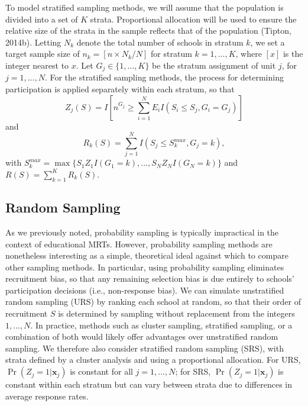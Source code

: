 \documentclass[
  english,
  man,floatsintext]{apa6}
\begin{document}
To model stratified sampling methods, we will assume that the population is divided into a set of \(K\) strata. Proportional allocation will be used to ensure the relative size of the strata in the sample reflects that of the population (Tipton, 2014b).
Letting \(N_k\) denote the total number of schools in stratum \(k\), we set a target sample size of \(n_k = [n \times N_k / N]\) for stratum \(k = 1,...,K\), where \([x]\) is the integer nearest to \(x\).
Let \(G_j \in \{1,...,K\}\) be the stratum assignment of unit \(j\), for \(j = 1,...,N\).
For the stratified sampling methods, the process for determining participation is applied separately within each stratum, so that
\begin{equation}
\label{eq:Zj-strat}
Z_j(S) = I\left[n^{G_j} \geq \sum_{i=1}^N E_i I\left(S_i \leq S_j, G_i = G_j\right)\right]
\end{equation}
and
\begin{equation}
\label{eq:R-strat}
R_k(S) = \sum_{j=1}^N I\left(S_j \leq S^{max}_k, G_j = k\right),
\end{equation}
with \(S^{max}_k = \max \{S_1 Z_1 I(G_1 = k), ..., S_N Z_N I(G_N = k)\}\) and \(R(S) = \sum_{k=1}^K R_k(S)\).

\hypertarget{random-sampling}{%
\subsection{Random Sampling}\label{random-sampling}}

As we previously noted, probability sampling is typically impractical in the context of educational MRTs. However, probability sampling methods are nonetheless interesting as a simple, theoretical ideal against which to compare other sampling methods.
In particular, using probability sampling eliminates recruitment bias, so that any remaining selection bias is due entirely to schools' participation decisions (i.e., non-response bias).
We can simulate unstratified random sampling (URS) by ranking each school at random, so that their order of recruitment \(S\) is determined by sampling without replacement from the integers \(1,...,N\). In practice, methods such as cluster sampling, stratified sampling, or a combination of both would likely offer advantages over unstratified random sampling. We therefore also consider stratified random sampling (SRS), with strata defined by a cluster analysis and using a proportional allocation. For URS, \(\Pr\left(Z_j = 1 | \mathbf{x}_j \right)\) is constant for all \(j = 1,...,N\); for SRS, \(\Pr\left(Z_j = 1 | \mathbf{x}_j \right)\) is constant within each stratum but can vary between strata due to differences in average response rates.
\end{document}
